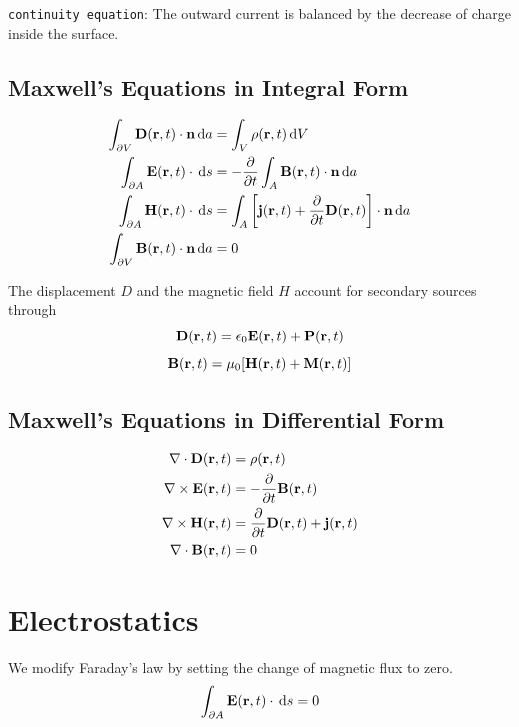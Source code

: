 \documentclass[a4paper, fontsize=8pt, landscape, DIV=1]{scrartcl}
\begin{document}
\begin{multicols*}{4}
  \texttt{continuity equation}: The outward current is balanced by the decrease of charge inside the surface.

  \subsection{Maxwell's Equations in Integral Form}
  \begin{align*}
    \int_{\partial V} \mathbf{D}(\mathbf{r},t) \cdot\mathbf{n}\,\mathrm{d} a &= \int_V \rho(\mathbf{r},t) \,\mathrm{d} V \\
    \int_{\partial A} \mathbf{E}(\mathbf{r},t) \cdot \,\mathrm{d} s &= -\frac{\partial}{\partial t}\int_A \mathbf{B}(\mathbf{r},t) \cdot \mathbf{n} \,\mathrm{d} a \\
    \int_{\partial A} \mathbf{H}(\mathbf{r},t) \cdot \,\mathrm{d} s &= \int_A \left[\mathbf{j}(\mathbf{r},t) + \frac{\partial}{\partial t}\mathbf{D}(\mathbf{r},t)\right] \cdot \mathbf{n} \,\mathrm{d} a \\
    \int_{\partial V} \mathbf{B}(\mathbf{r},t) \cdot \mathbf{n} \,\mathrm{d} a &= 0
  \end{align*}

  The displacement $D$ and the magnetic field $H$ account for secondary sources through
  \[\mathbf{D}(\mathbf{r},t) = \epsilon_0 \mathbf{E}(\mathbf{r},t)+\mathbf{P}(\mathbf{r},t)\]
  \[ \mathbf{B}(\mathbf{r},t) = \mu_0 [\mathbf{H}(\mathbf{r},t) + \mathbf{M}(\mathbf{r},t)]\]

  \subsection{Maxwell's Equations in Differential Form}
  \begin{align*}
    \nabla \cdot \mathbf{D}(\mathbf{r},t) &= \rho(\mathbf{r},t) \\
    \nabla\times \mathbf{E}(\mathbf{r},t) &= -\frac{\partial}{\partial t}\mathbf{B}(\mathbf{r},t) \\
    \nabla\times \mathbf{H}(\mathbf{r},t) &= \frac{\partial}{\partial t}\mathbf{D}(\mathbf{r},t) + \mathbf{j}(\mathbf{r},t)\\
    \nabla \cdot \mathbf{B}(\mathbf{r},t) &= 0
  \end{align*}

  \section{Electrostatics}
  We modify Faraday's law by setting the change of magnetic flux to zero. 
  \[\int_{\partial A}\mathbf{E}(\mathbf{r},t)\cdot \,\mathrm{d} s = 0 \]


\end{multicols*}
\end{document}
